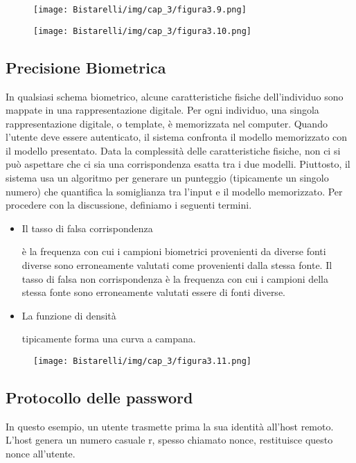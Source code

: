 \begin{figure}[H]
	\centering
    \texttt{[image: Bistarelli/img/cap\_3/figura3.9.png]}
\end{figure}

\begin{figure}[H]
	\centering
    \texttt{[image: Bistarelli/img/cap\_3/figura3.10.png]}
\end{figure}

\subsection{Precisione Biometrica}

In qualsiasi schema biometrico, alcune caratteristiche fisiche dell'individuo sono mappate in una rappresentazione digitale. Per ogni individuo, una singola rappresentazione digitale, o template, è memorizzata nel computer. Quando l'utente deve essere autenticato, il sistema confronta il modello memorizzato con il modello presentato. Data la complessità delle caratteristiche fisiche, non ci si può aspettare che ci sia una corrispondenza esatta tra i due modelli. Piuttosto, il sistema usa un algoritmo per generare un punteggio (tipicamente un singolo numero) che quantifica la somiglianza tra l'input e il modello memorizzato. Per procedere con la discussione, definiamo i seguenti termini.

\begin{itemize}
    \item Il tasso di falsa corrispondenza
    
    è la frequenza con cui i campioni biometrici provenienti da diverse fonti diverse sono erroneamente valutati come provenienti dalla stessa fonte. Il tasso di falsa non corrispondenza è la frequenza con cui i campioni della stessa fonte sono erroneamente valutati essere di fonti diverse.
    
    \item La funzione di densità
    
    tipicamente forma una curva a campana.
\end{itemize}
\begin{figure}[H]
	\centering
    \texttt{[image: Bistarelli/img/cap\_3/figura3.11.png]}
\end{figure}
\newpage
\subsection{Protocollo delle password}
In questo esempio, un utente trasmette prima la sua identità all'host remoto. L'host genera un numero casuale r, spesso chiamato nonce, restituisce questo nonce all'utente.

